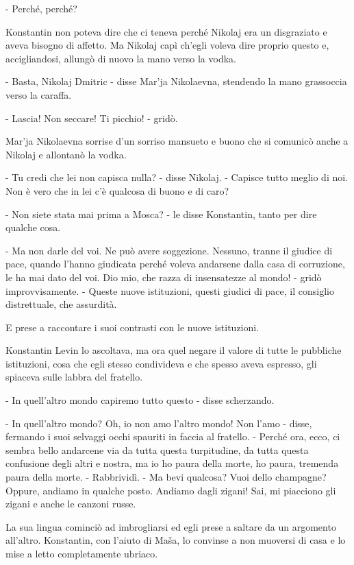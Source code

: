 - Perché, perché? 

Konstantin non poteva dire che ci teneva perché Nikolaj era un disgraziato e aveva bisogno di affetto. Ma Nikolaj capì ch'egli voleva dire proprio questo e, accigliandosi, allungò di nuovo la mano verso la vodka. 

- Basta, Nikolaj Dmitric - disse Mar'ja Nikolaevna, stendendo la mano grassoccia verso la caraffa. 

- Lascia! Non seccare! Ti picchio! - gridò. 

Mar'ja Nikolaevna sorrise d'un sorriso mansueto e buono che si comunicò anche a Nikolaj e allontanò la vodka. 

- Tu credi che lei non capisca nulla? - disse Nikolaj. - Capisce tutto meglio di noi. Non è vero che in lei c'è qualcosa di buono e di caro? 

- Non siete stata mai prima a Mosca? - le disse Konstantin, tanto per dire qualche cosa. 

- Ma non darle del voi. Ne può avere soggezione. Nessuno, tranne il giudice di pace, quando l'hanno giudicata perché voleva andarsene dalla casa di corruzione, le ha mai dato del voi. Dio mio, che razza di insensatezze al mondo! - gridò improvvisamente. - Queste nuove istituzioni, questi giudici di pace, il consiglio distrettuale, che assurdità. 

E prese a raccontare i suoi contrasti con le nuove istituzioni. 

Konstantin Levin lo ascoltava, ma ora quel negare il valore di tutte le pubbliche istituzioni, cosa che egli stesso condivideva e che spesso aveva espresso, gli spiaceva sulle labbra del fratello. 

- In quell'altro mondo capiremo tutto questo - disse scherzando. 

- In quell'altro mondo? Oh, io non amo l'altro mondo! Non l'amo - disse, fermando i suoi selvaggi occhi spauriti in faccia al fratello. - Perché ora, ecco, ci sembra bello andarcene via da tutta questa turpitudine, da tutta questa confusione degli altri e nostra, ma io ho paura della morte, ho paura, tremenda paura della morte. - Rabbrividì. - Ma bevi qualcosa? Vuoi dello champagne? Oppure, andiamo in qualche posto. Andiamo dagli zigani! Sai, mi piacciono gli zigani e anche le canzoni russe. 

La sua lingua cominciò ad imbrogliarsi ed egli prese a saltare da un argomento all'altro. Konstantin, con l'aiuto di Maša, lo convinse a non muoversi di casa e lo mise a letto completamente ubriaco. 

